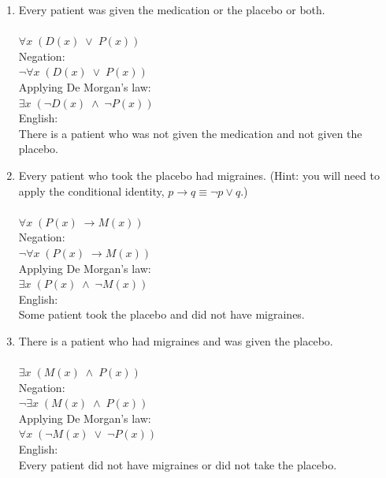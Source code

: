 \documentclass{amsart}
\theoremstyle{definition}
\theoremstyle{Exercise}
\theoremstyle{remark}
\theoremstyle{rule}
\numberwithin{equation}{section}
\begin{document}
\begin{enumerate}[label=(\alph*)]

\item Every patient was given the medication or the placebo or both.\\\\
$\forall x\; (D(x)\; \lor\; P(x))$\\

Negation:\\
$\neg \forall x\; (D(x)\; \lor\; P(x))$\\

Applying De Morgan's law:\\
$\exists x\; (\neg D(x)\; \land\; \neg P(x))$\\

English:\\
There is a patient who was not given the medication and not given the placebo.\\

\item Every patient who took the placebo had migraines. (Hint: you will need to apply the conditional identity, $p \to q \equiv \neg p \lor q$.)\\\\
$\forall x\; (P(x)\; \to M(x))$\\

Negation:\\
$\neg \forall x\; (P(x)\; \to M(x))$\\

Applying De Morgan's law:\\
$\exists x\; (P(x)\; \land\; \neg M(x))$\\

English:\\
Some patient took the placebo and did not have migraines.\\

\item There is a patient who had migraines and was given the placebo.\\\\
$\exists x\; (M(x)\; \land\; P(x))$\\

Negation:\\
$\neg \exists x\; (M(x)\; \land\; P(x))$\\

Applying De Morgan's law:\\
$\forall x\; (\neg M(x)\; \lor\; \neg P(x))$\\

English:\\
Every patient did not have migraines or did not take the placebo.
\\\\
\end{enumerate}
\end{document}
